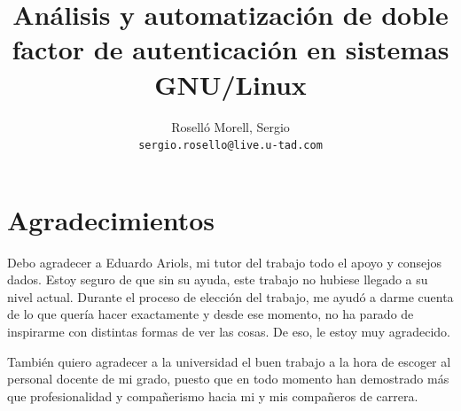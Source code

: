 \documentclass[titlepage, 12pt, a4paper]{article}
\title{\color{white}Análisis y automatización de doble factor de autenticación en sistemas GNU/Linux}
\author{\color{white}Roselló Morell, Sergio\\
\texttt{\color{white}sergio.rosello@live.u-tad.com}}
\begin{document}
\afterpage{\restorepagecolor}
\maketitle
\tableofcontents
\clearpage
\section{Agradecimientos}
Debo agradecer a Eduardo Ariols, mi tutor del trabajo todo el apoyo y consejos dados. Estoy seguro de que sin su ayuda, este trabajo no hubiese llegado a su nivel actual. Durante el proceso de elección del trabajo, me ayudó a darme cuenta de lo que quería hacer exactamente y desde ese momento, no ha parado de inspirarme con distintas formas de ver las cosas. De eso, le estoy muy agradecido.\par También quiero agradecer a la universidad el buen trabajo a la hora de escoger al personal docente de mi grado, puesto que en todo momento han demostrado más que profesionalidad y compañerismo hacia mi y mis compañeros de carrera.
\clearpage
\end{document}
